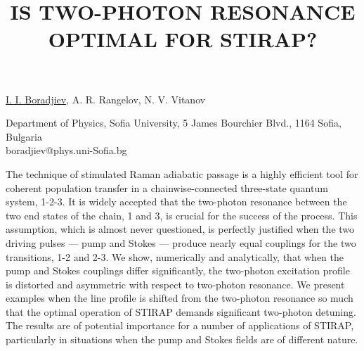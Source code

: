 \title{IS TWO-PHOTON RESONANCE OPTIMAL FOR STIRAP?}

\underline{I. I. Boradjiev}, A. R. Rangelov, N. V. Vitanov


Department of Physics, Sofia University, 5 James Bourchier Blvd., 1164
Sofia, Bulgaria\\
boradjiev@phys.uni-Sofia.bg

The technique of stimulated Raman adiabatic passage is a highly efficient tool for coherent population transfer in a chainwise-connected three-state quantum system, 1-2-3.
It is widely accepted that the two-photon resonance between the two end states of the chain, 1 and 3, is crucial for the success of the process.
This assumption, which is almost never questioned, is perfectly justified when the two driving pulses --- pump and Stokes --- produce nearly equal couplings for the two transitions, 1-2 and 2-3.
We show, numerically and analytically, that when the pump and Stokes couplings differ significantly, the two-photon excitation profile is distorted and asymmetric with respect to two-photon resonance.
We present examples when the line profile is shifted from the two-photon resonance so much that the optimal operation of STIRAP demands significant two-photon detuning.
The results are of potential importance for a number of applications of STIRAP, particularly in situations when the pump and Stokes fields are of different nature.

\vspace{\baselineskip}